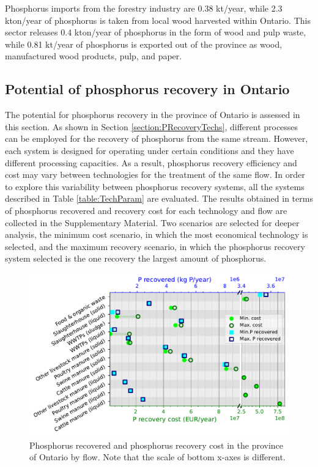 \documentclass[authoryear]{elsarticle}
\begin{document}
Phosphorus imports from the forestry industry are 0.38 kt/year, while 2.3 kton/year of phosphorus is taken from local wood harvested within Ontario. This sector releases 0.4 kton/year of phosphorus in the form of wood and pulp waste, while 0.81 kt/year of phosphorus is exported out of the province as wood, manufactured wood products, pulp, and paper.


\subsection{Potential of phosphorus recovery in Ontario}

The potential for phosphorus recovery in the province of Ontario
is assessed in this section. As shown in Section \ref{section:PRecoveryTechs}, different processes can be employed for the recovery of phosphorus from the same stream. However, each system is designed for operating under certain conditions and they have different processing capacities. As a result, phosphorus recovery efficiency and cost may vary between technologies for the treatment of the same flow. In order to explore this variability between phosphorus recovery systems, all the systems described in Table \ref{table:TechParam} are evaluated. The results obtained in terms of phosphorus recovered and recovery cost for each technology and flow are collected in the Supplementary Material. Two scenarios are selected for deeper analysis, the minimum cost scenario, in which the most economical technology is selected, and the maximum recovery scenario, in which the phosphorus recovery system selected is the one recovery the largest amount of phosphorus.

\begin{figure}[H]
	\centering
	\includegraphics[width=0.85\linewidth, trim={0cm 0cm 0cm 0cm},clip]{Figures/Results_PlotSummary.pdf} 
	\caption{Phosphorus recovered and phosphorus recovery cost in the province of Ontario by flow. Note that the scale of bottom x-axes is different.}
	\label{fig:Results_PlotSummary}
\end{figure}
\end{document}
